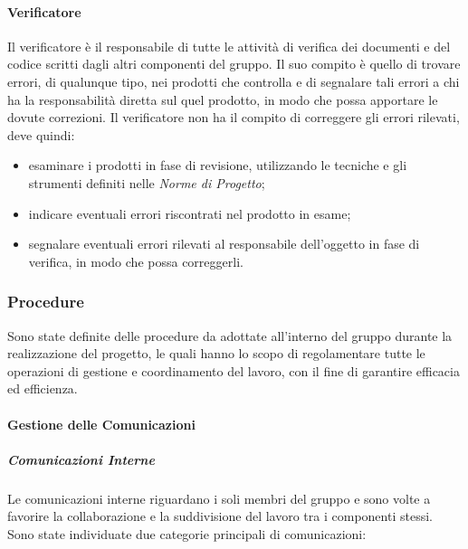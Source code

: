 		\paragraph{Verificatore}
		
			Il verificatore è il responsabile di tutte le attività di verifica dei documenti e del codice scritti dagli altri componenti del gruppo. Il suo compito è quello di trovare errori, di qualunque tipo, nei prodotti che controlla e di segnalare tali errori a chi ha la responsabilità diretta sul quel prodotto, in modo che possa apportare le dovute correzioni.\newline
			Il verificatore non ha il compito di correggere gli errori rilevati, deve quindi:
			
			\begin{itemize}
				\item esaminare i prodotti in fase di revisione, utilizzando le tecniche e gli strumenti definiti nelle \textit{Norme di Progetto};
				\item indicare eventuali errori riscontrati nel prodotto in esame;
				\item segnalare eventuali errori rilevati al responsabile dell'oggetto in fase di verifica, in modo che possa correggerli.
			\end{itemize}	
	
	\subsubsection{Procedure}
		
		Sono state definite delle procedure da adottate all'interno del gruppo durante la realizzazione del progetto, le quali hanno lo scopo di regolamentare tutte le operazioni di gestione e coordinamento del lavoro, con il fine di garantire efficacia ed efficienza.
		
		\paragraph{Gestione delle Comunicazioni}
		
			\subparagraph{Comunicazioni Interne}
			
				Le comunicazioni interne riguardano i soli membri del gruppo e sono volte a favorire la collaborazione e la suddivisione del lavoro tra i componenti stessi.\newline
				Sono state individuate due categorie principali di comunicazioni:
				
